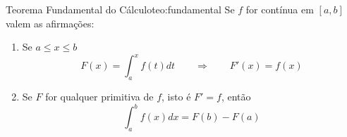 \begin{teorema}{Teorema Fundamental do Cálculo}{teo:fundamental}
  Se $f$ for contínua em $[a, b]$ valem as afirmações:
  \begin{enumerate}
    \item Se \(a \leq x \leq b\)
      \[
        F(x)  = \int_a^x f(t)dt
        \qquad\Rightarrow\qquad
        F'(x) = f(x)
      \]
    \item Se $F$ for qualquer primitiva de $f$, isto é $F'=f$, então
      \[
        \int_a^{b}f(x)dx= F(b)-F(a)
      \]
  \end{enumerate}
\end{teorema}

